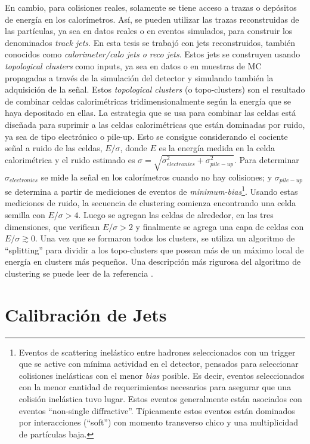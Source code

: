 En cambio, para colisiones reales, solamente se tiene acceso a trazas o depósitos de energía en los calorímetros. Así, se pueden utilizar las trazas reconstruidas de las partículas, ya sea en datos reales o en eventos simulados, para construir los denominados \textit{track jets}. 
En esta tesis se trabajó con jets reconstruidos, también conocidos como \textit{calorimeter/calo jets o reco jets}. Estos jets se construyen usando \textit{topological clusters} como inputs, ya sea en datos o en muestras de MC propagadas a través de la simulación del detector y simulando también la adquisición de la señal. 
Estos \textit{topological clusters} (o topo-clusters) son el resultado de combinar celdas calorimétricas tridimensionalmente según la energía que se haya depositado en ellas. La estrategia que se usa para combinar las celdas está diseñada para suprimir a las celdas calorimétricas que están dominadas por ruido, ya sea de tipo electrónico o pile-up. Esto se consigue considerando el cociente señal a ruido de las celdas, $E/\sigma$, donde $E$ es la energía medida en la celda calorimétrica y el ruido estimado es $\sigma=\sqrt{\sigma_{electronics}^2 + \sigma_{pile-up}^2}$. Para determinar $\sigma_{electronics}$ se mide la señal en los calorímetros cuando no hay colisiones; y  $\sigma_{pile-up}$ se determina a partir de mediciones de eventos de \textit{minimum-bias}\footnote{Eventos de scattering inelástico entre hadrones seleccionados con un trigger que se active con mínima actividad en el detector, pensados para seleccionar colisiones inelásticas con el menor \textit{bias} posible. Es decir, eventos seleccionados con la menor cantidad de requerimientos necesarios para asegurar que una colisión inelástica tuvo lugar. Estos eventos generalmente están asociados con eventos ``non-single diffractive''. Típicamente estos eventos están dominados por interacciones (``soft'') con momento transverso chico y una multiplicidad de partículas baja.}. Usando estas mediciones de ruido, la secuencia de clustering comienza encontrando una celda semilla con $E/\sigma>4$. Luego se agregan las celdas de alrededor, en las tres dimensiones, que verifican $E/\sigma>2$ y finalmente se agrega una capa de celdas con $E/\sigma\gtrsim0$. Una vez que se formaron todos los clusters, se utiliza un algoritmo de ``splitting'' para dividir a los topo-clusters que posean más de un máximo local de energía en clusters más pequeños. Una descripción más rigurosa del algoritmo de clustering se puede leer de la referencia \cite{TopoCluster}. 


\section{Calibración de Jets}\label{JetCalib}

